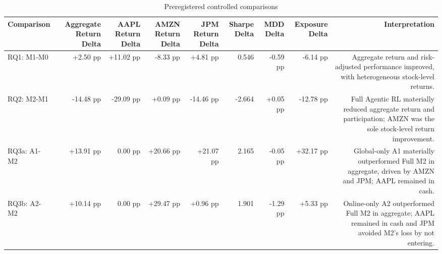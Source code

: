 \begin{table}[htbp]
\centering
\small
\caption{Preregistered controlled comparisons}
\label{tab:controlled-comparisons}
\begin{tabular}{lrrrrrrrr}
\toprule
Comparison & Aggregate Return Delta & AAPL Return Delta & AMZN Return Delta & JPM Return Delta & Sharpe Delta & MDD Delta & Exposure Delta & Interpretation \\
\midrule
RQ1: M1-M0 & +2.50 pp & +11.02 pp & -8.33 pp & +4.81 pp & 0.546 & -0.59 pp & -6.14 pp & Aggregate return and risk-adjusted performance improved, with heterogeneous stock-level returns. \\
RQ2: M2-M1 & -14.48 pp & -29.09 pp & +0.09 pp & -14.46 pp & -2.664 & +0.05 pp & -12.78 pp & Full Agentic RL materially reduced aggregate return and participation; AMZN was the sole stock-level return improvement. \\
RQ3a: A1-M2 & +13.91 pp & 0.00 pp & +20.66 pp & +21.07 pp & 2.165 & -0.05 pp & +32.17 pp & Global-only A1 materially outperformed Full M2 in aggregate, driven by AMZN and JPM; AAPL remained in cash. \\
RQ3b: A2-M2 & +10.14 pp & 0.00 pp & +29.47 pp & +0.96 pp & 1.901 & -1.29 pp & +5.33 pp & Online-only A2 outperformed Full M2 in aggregate; AAPL remained in cash and JPM avoided M2's loss by not entering. \\
\bottomrule
\end{tabular}
\end{table}
